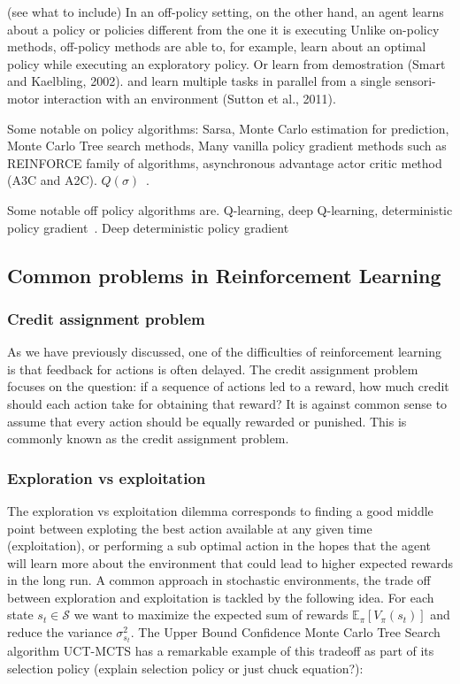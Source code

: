 \documentclass{../main.tex}{subfiles}
\begin{document}
(see what to include) In an off-policy setting, on the other hand, an agent learns about a policy or policies different from the one it is executing Unlike on-policy methods, off-policy methods are able to, for example, learn about an optimal policy while executing an exploratory policy. Or learn from demostration (Smart and Kaelbling, 2002).
and learn multiple tasks in parallel from a single sensori- motor interaction with an environment (Sutton et al., 2011).

Some notable on policy algorithms: Sarsa, Monte Carlo estimation for prediction, Monte Carlo Tree search methods,  Many vanilla policy gradient methods such as REINFORCE\citep{Williams1992} family of algorithms, asynchronous advantage actor critic method (A3C and A2C). $Q(\sigma)$~\citep{Deasis2017}.

Some notable off policy algorithms are. Q-learning, deep Q-learning, deterministic policy gradient~\citep{Silver2014}. Deep deterministic policy gradient~\citep{Lillicrap2015}


\subsection{Common problems in Reinforcement Learning}
\subsubsection{Credit assignment problem}
As we have previously discussed, one of the difficulties of reinforcement learning is that feedback for actions is often delayed. The credit assignment problem focuses on the question: if a sequence of actions led to a reward, how much credit should each action take for obtaining that reward? It is against common sense to assume that every action should be equally rewarded or punished. This is commonly known as the credit assignment problem.
\subsubsection{Exploration vs exploitation}
The exploration vs exploitation dilemma corresponds to finding a good middle point between exploting the best action available at any given time (exploitation), or performing a sub optimal action in the hopes that the agent will learn more about the environment that could lead to higher expected rewards in the long run. A common approach in stochastic environments, the trade off between exploration and exploitation is tackled by the following idea. For each state $s_t \in \mathcal{S}$ we want to maximize the expected sum of rewards $\mathbb{E}_{\pi}[V_{\pi}(s_t)]$ and reduce the variance $\sigma^2_{s_t}$. The Upper Bound Confidence Monte Carlo Tree Search algorithm UCT-MCTS has a remarkable example of this tradeoff as part of its selection policy (explain selection policy or just chuck equation?):
\end{document}
